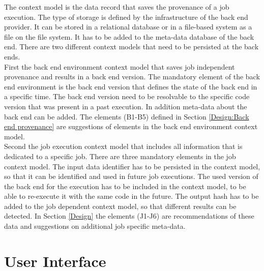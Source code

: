 \documentclass[draft,final]{vutinfth} %
\begin{document}
The context model is the data record that saves the provenance of a job execution. The type of storage is defined by the infrastructure of the back end provider. It can be stored in a relational database or in a file-based system as a file on the file system. It has to be added to the meta-data database of the back end. There are two different context models that need to be persisted at the back ends. \\
First the back end environment context model that saves job independent provenance and results in a back end version. The mandatory element of the back end environment is the back end version that defines the state of the back end in a specific time. The back end version need to be resolvable to the specific code version that was present in a past execution. In addition meta-data about the back end can be added. The elements (B1-B5) defined in Section \ref{Design:Back end provenance} are suggestions of elements in the back end environment context model.\\
Second the job execution context model that includes all information that is dedicated to a specific job. There are three mandatory elements in the job context model. The input data identifier has to be persisted in the context model, so that it can be identified and used in future job executions. The used version of the back end for the execution has to be included in the context model, to be able to re-execute it with the same code in the future. The output hash has to be added to the job dependent context model, so that different results can be detected. In Section \ref{Design} the elements (J1-J6) are recommendations of these data and suggestions on additional job specific meta-data.  



\section{User Interface}\label{Design:User Interface}
\end{document}

